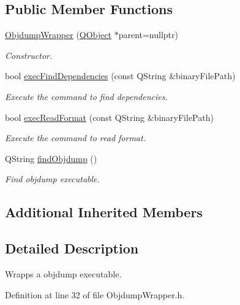 \subsection*{Public Member Functions}
\begin{DoxyCompactItemize}
\item 
\hyperlink{class_mdt_1_1_deploy_utils_1_1_objdump_wrapper_a6f042e9d1554f14fcc320c2efef16ffa}{Objdump\+Wrapper} (\hyperlink{class_q_object}{Q\+Object} $\ast$parent=nullptr)
\begin{DoxyCompactList}\small\item\em Constructor. \end{DoxyCompactList}\item 
bool \hyperlink{class_mdt_1_1_deploy_utils_1_1_objdump_wrapper_ab97db66a2a9ad2db9932a7c833c11cd1}{exec\+Find\+Dependencies} (const Q\+String \&binary\+File\+Path)
\begin{DoxyCompactList}\small\item\em Execute the command to find dependencies. \end{DoxyCompactList}\item 
bool \hyperlink{class_mdt_1_1_deploy_utils_1_1_objdump_wrapper_a38237494f7027dec851514c7f7179278}{exec\+Read\+Format} (const Q\+String \&binary\+File\+Path)
\begin{DoxyCompactList}\small\item\em Execute the command to read format. \end{DoxyCompactList}\item 
Q\+String \hyperlink{class_mdt_1_1_deploy_utils_1_1_objdump_wrapper_a515708420d15527141d19c365d3f1bd6}{find\+Objdump} ()
\begin{DoxyCompactList}\small\item\em Find objdump executable. \end{DoxyCompactList}\end{DoxyCompactItemize}
\subsection*{Additional Inherited Members}


\subsection{Detailed Description}
Wrapps a objdump executable. 

Definition at line 32 of file Objdump\+Wrapper.\+h.




